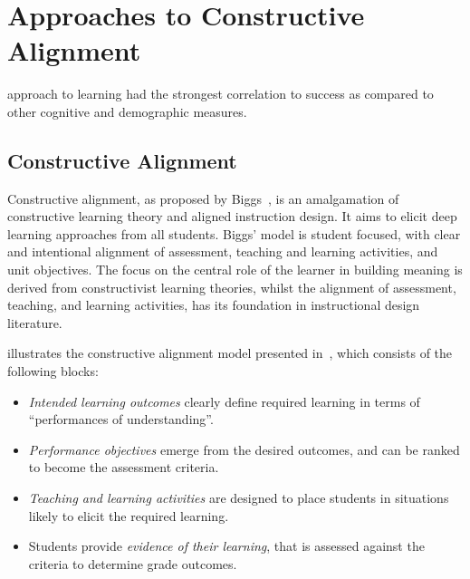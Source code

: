 
\chapter{Approaches to Constructive Alignment} %
\label{cha:background}

\graphicspath{{Figures/Background/}}

\cite{DeRaadt:2005} approach to learning  had the strongest correlation to success as compared to other cognitive and demographic measures.

\section{Constructive Alignment} %
\label{sec:constructive_alignment}

Constructive alignment, as proposed by Biggs~\cite{Biggs:1996c}, is an amalgamation of constructive learning theory and aligned instruction design. It aims to elicit deep learning approaches from all students. Biggs' model is student focused, with clear and intentional alignment of assessment, teaching and learning activities, and unit objectives. The focus on the central role of the learner in building meaning is derived from constructivist learning theories, whilst the alignment of assessment, teaching, and learning activities, has its foundation in instructional design literature. 

 illustrates the constructive alignment model presented in~\cite{Houghton:2004}, which consists of the following blocks:

\begin{itemize}
	\item \emph{Intended learning outcomes} clearly define required learning in terms of ``performances of understanding''.
	\item \emph{Performance objectives} emerge from the desired outcomes, and can be ranked to become the assessment criteria.
	\item \emph{Teaching and learning activities} are designed to place students in situations likely to elicit the required learning.
	\item Students provide \emph{evidence of their learning}, that is assessed against the criteria to determine grade outcomes.
\end{itemize}


